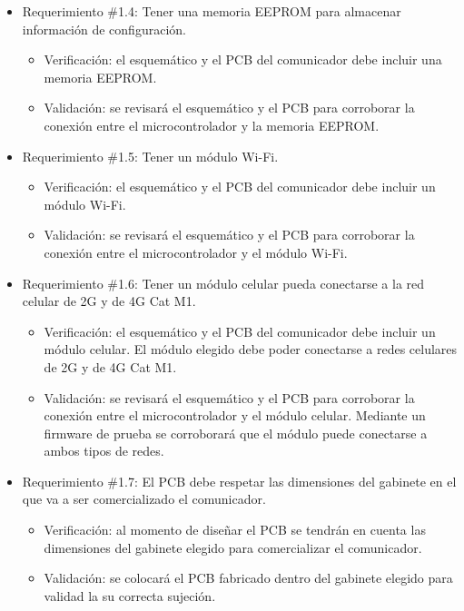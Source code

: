 \documentclass[
11pt, %
]{charter}
\begin{document}
\begin{itemize}
	\item Requerimiento \#1.4: Tener una memoria EEPROM para almacenar información de configuración.
	\begin{itemize}
		\item Verificación: el esquemático y el PCB del comunicador debe incluir una memoria EEPROM.
		\item Validación: se revisará el esquemático y el PCB para corroborar la conexión entre el microcontrolador y la memoria EEPROM.
	\end{itemize}
			
	\item Requerimiento \#1.5: Tener un módulo Wi-Fi. 
	\begin{itemize}
		\item Verificación: el esquemático y el PCB del comunicador debe incluir un módulo Wi-Fi.
		\item Validación: se revisará el esquemático y el PCB para corroborar la conexión entre el microcontrolador y el módulo Wi-Fi.
	\end{itemize}
			
	\item Requerimiento \#1.6: Tener un módulo celular pueda conectarse a la red celular de 2G y de 4G Cat M1.
	\begin{itemize}
		\item Verificación: el esquemático y el PCB del comunicador debe incluir un módulo celular. El módulo elegido debe poder conectarse a redes celulares de 2G y de 4G Cat M1.
		\item Validación: se revisará el esquemático y el PCB para corroborar la conexión entre el microcontrolador y el módulo celular. Mediante un firmware de prueba se corroborará que el módulo puede conectarse a ambos tipos de redes.
	\end{itemize}
			
	\item Requerimiento \#1.7: El PCB debe respetar las dimensiones del gabinete en el que va a ser comercializado el comunicador.
	\begin{itemize}
		\item Verificación: al momento de diseñar el PCB se tendrán en cuenta las dimensiones del gabinete elegido para comercializar el comunicador.
		\item Validación: se colocará el PCB fabricado dentro del gabinete elegido para validad la su correcta sujeción.
	\end{itemize}
			

\end{itemize}
\end{document}
